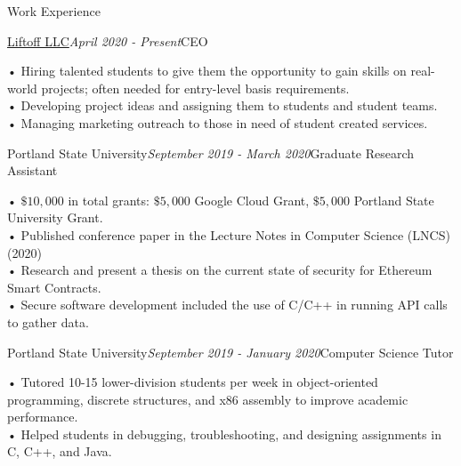 \documentclass{resume} %
\begin{document}

\begin{rSection}{Work Experience}
  \begin{rSubsection}{\href{https://liftoffcom-81.webself.net/}{Liftoff LLC}}{{\em{April 2020 - Present}}}{CEO}{}
\item • Hiring talented students to give them the opportunity to gain skills on real-world projects; often needed for entry-level basis requirements.
  \\• Developing project ideas and assigning them to students and student teams.
  \\• Managing marketing outreach to those in need of student created services.
\end{rSubsection}

  \begin{rSubsection}{Portland State University}{{\em{September 2019 - March 2020}}}{Graduate Research Assistant}{}
\item • $\$10,000$ in total grants: $\$5,000$ Google Cloud Grant, $\$5,000$ Portland State University Grant.
  \\• Published conference paper in the Lecture Notes in Computer Science (LNCS) (2020)
  \\• Research and present a thesis on the current state of security for Ethereum Smart Contracts.
  \\• Secure software development included the use of C/C++ in running API calls to gather data.
\end{rSubsection}

  \begin{rSubsection}{Portland State University}{{\em{September 2019 - January 2020}}}{Computer Science Tutor}{}
\item • Tutored 10-15 lower-division students per week in object-oriented programming, discrete structures, and x86 assembly to improve academic performance.
\\• Helped students in debugging, troubleshooting, and designing assignments in C, C++, and Java.
\end{rSubsection}

\end{rSection}

\end{document}
